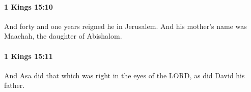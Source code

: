 		\paragraph{1 Kings 15:10} %
			\label{1KINGS-15-10}

			And forty and one years reigned he in Jerusalem. And his mother’s name was Maachah, the daughter of Abishalom.


		\paragraph{1 Kings 15:11} %
			\label{1KINGS-15-11}

			And Asa did that which was right in the eyes of the LORD, as did David his father.



